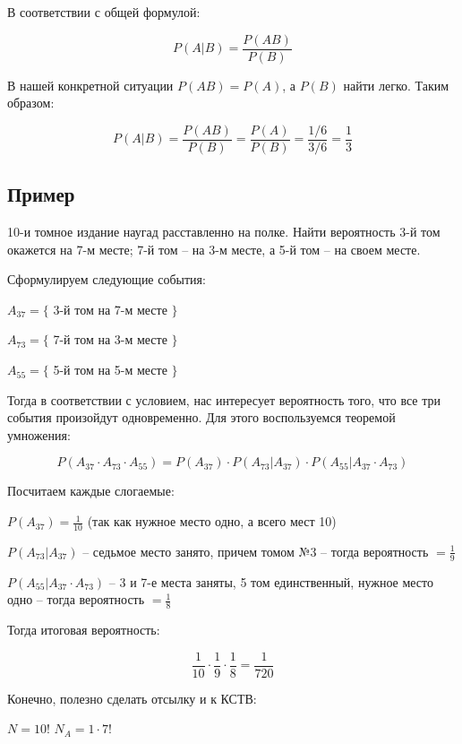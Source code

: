 \documentclass{article}
\begin{document}
В соответствии с общей формулой:

$$P(A|B) = \frac{P(AB)}{P(B)}$$

В нашей конкретной ситуации $P(AB) = P(A)$, а $P(B)$ найти легко. Таким образом:

$$P(A|B) = \frac{P(AB)}{P(B)} = \frac{P(A)}{P(B)} = \frac{1 / 6}{3 / 6} = \frac{1}{3}$$ 

\subsection{Пример}

10-и томное издание наугад расставленно на полке. Найти вероятность 3-й том окажется на 7-м месте; 7-й том -- на 3-м месте, а 5-й том -- на своем месте.

\quad

Сформулируем следующие события:

$A_{37} = \{$ 3-й том на 7-м месте $\}$

$A_{73} = \{$ 7-й том на 3-м месте $\}$

$A_{55} = \{$ 5-й том на 5-м месте $\}$

\quad

Тогда в соответствии с условием, нас интересует вероятность того, что все три события произойдут одновременно. Для этого воспользуемся теоремой умножения:

$$ P(A_{37} \cdot A_{73} \cdot A_{55}) = P(A_{37}) \cdot P(A_{73} | A_{37}) \cdot P(A_{55} | A_{37}\cdot A_{73}) $$

Посчитаем каждые слогаемые:

$P(A_{37}) = \frac{1}{10}$ (так как нужное место одно, а всего мест 10)

$P(A_{73} | A_{37}) $ -- седьмое место занято, причем томом №3 -- тогда вероятность $ = \frac{1}{9}$

$P(A_{55} | A_{37}\cdot A_{73}) $ -- 3 и 7-е места заняты, 5 том единственный, нужное место одно -- тогда вероятность $ = \frac{1}{8} $

Тогда итоговая вероятность:

$$\frac{1}{10} \cdot \frac{1}{9} \cdot \frac{1}{8} = \frac{1}{720} $$

\quad

\quad

Конечно, полезно сделать отсылку и к КСТВ:

\quad

$N = 10!$ \qquad\qquad\qquad $N_A = 1 \cdot 7!$

\quad
\end{document}
